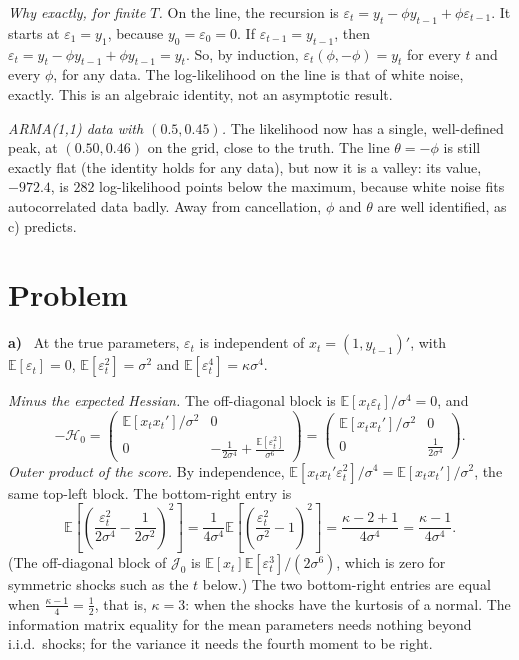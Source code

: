 \documentclass[11pt]{article}
\newcommand{\E}{\mathbb{E}}
\newcounter{problem}
\renewcommand{\theproblem}{\arabic{problem}}
\newcommand{\problem}{
	\stepcounter{problem}
	\section*{Problem \theproblem}
}
\newcommand{\itm}[1]{\par\textbf{#1)}\ }
\begin{document}
\emph{Why exactly, for finite $T$.} On the line, the recursion is $\varepsilon_t=y_t-\phi y_{t-1}+\phi\varepsilon_{t-1}$. It starts at $\varepsilon_1=y_1$, because $y_0=\varepsilon_0=0$. If $\varepsilon_{t-1}=y_{t-1}$, then $\varepsilon_t=y_t-\phi y_{t-1}+\phi y_{t-1}=y_t$. So, by induction, $\varepsilon_t(\phi,-\phi)=y_t$ for every $t$ and every $\phi$, for any data. The log-likelihood on the line is that of white noise, exactly. This is an algebraic identity, not an asymptotic result.

\emph{ARMA(1,1) data with $(0.5,0.45)$.} The likelihood now has a single, well-defined peak, at $(0.50,0.46)$ on the grid, close to the truth. The line $\theta=-\phi$ is still exactly flat (the identity holds for any data), but now it is a valley: its value, $-972.4$, is $282$ log-likelihood points below the maximum, because white noise fits autocorrelated data badly. Away from cancellation, $\phi$ and $\theta$ are well identified, as c) predicts.



\problem

\itm{a}
At the true parameters, $\varepsilon_t$ is independent of $x_t=(1,y_{t-1})'$, with $\E[\varepsilon_t]=0$, $\E[\varepsilon_t^2]=\sigma^2$ and $\E[\varepsilon_t^4]=\kappa\sigma^4$.

\emph{Minus the expected Hessian.} The off-diagonal block is $\E[x_t\varepsilon_t]/\sigma^4=0$, and
\[
-\mathcal H_0=\begin{pmatrix}\E[x_tx_t']/\sigma^2&0\\0&-\frac1{2\sigma^4}+\frac{\E[\varepsilon_t^2]}{\sigma^6}\end{pmatrix}
=\begin{pmatrix}\E[x_tx_t']/\sigma^2&0\\0&\frac1{2\sigma^4}\end{pmatrix}.
\]
\emph{Outer product of the score.} By independence, $\E[x_tx_t'\varepsilon_t^2]/\sigma^4=\E[x_tx_t']/\sigma^2$, the same top-left block. The bottom-right entry is
\[
\E\left[\left(\frac{\varepsilon_t^2}{2\sigma^4}-\frac1{2\sigma^2}\right)^2\right]=\frac{1}{4\sigma^4}\E\left[\left(\frac{\varepsilon_t^2}{\sigma^2}-1\right)^2\right]=\frac{\kappa-2+1}{4\sigma^4}=\frac{\kappa-1}{4\sigma^4}.
\]
(The off-diagonal block of $\mathcal J_0$ is $\E[x_t]\E[\varepsilon_t^3]/(2\sigma^6)$, which is zero for symmetric shocks such as the $t$ below.) The two bottom-right entries are equal when $\frac{\kappa-1}4=\frac12$, that is, $\kappa=3$: when the shocks have the kurtosis of a normal. The information matrix equality for the mean parameters needs nothing beyond i.i.d.\ shocks; for the variance it needs the fourth moment to be right.
\end{document}
